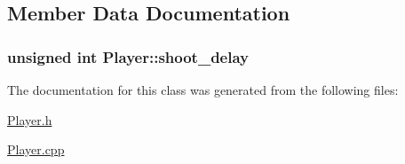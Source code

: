 \subsection{Member Data Documentation}
\hypertarget{class_player_ab6e35dfaece8703f3906fc3a09d61078}{}
\subsubsection[{shoot\+\_\+delay}]{\setlength{\rightskip}{0pt plus 5cm}unsigned int Player\+::shoot\+\_\+delay\hspace{0.3cm}{\ttfamily [protected]}}\label{class_player_ab6e35dfaece8703f3906fc3a09d61078}


The documentation for this class was generated from the following files\+:\begin{DoxyCompactItemize}
\item 
\hyperlink{_player_8h}{Player.\+h}\item 
\hyperlink{_player_8cpp}{Player.\+cpp}\end{DoxyCompactItemize}

